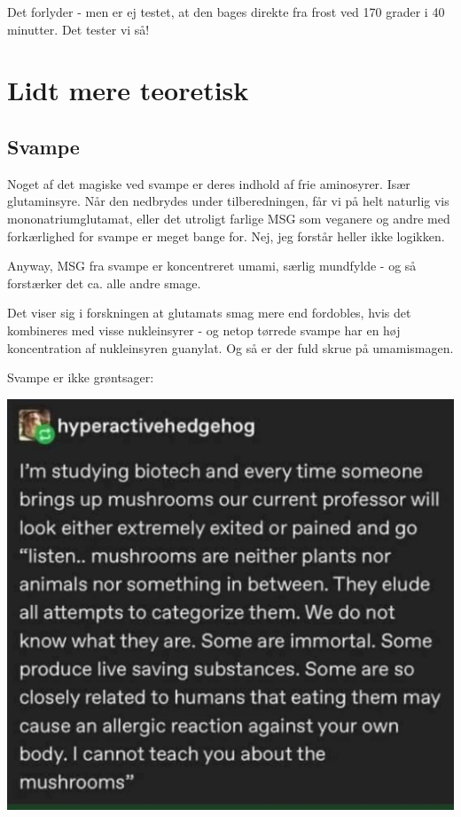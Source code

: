 \documentclass[
]{book}
\begin{document}
Det forlyder - men er ej testet, at den bages direkte fra
frost ved 170 grader i 40 minutter.
Det tester vi så!

\hypertarget{lidt-mere-teoretisk}{%
\chapter{Lidt mere teoretisk}\label{lidt-mere-teoretisk}}

\hypertarget{svampe}{%
\section{Svampe}\label{svampe}}

Noget af det magiske ved svampe er deres indhold af frie aminosyrer. Især
glutaminsyre. Når den nedbrydes under tilberedningen, får vi på helt naturlig
vis mononatriumglutamat, eller det utroligt farlige MSG som veganere og andre
med forkærlighed for svampe er meget bange for. Nej, jeg forstår heller ikke
logikken.

Anyway, MSG fra svampe er koncentreret umami, særlig mundfylde - og så forstærker
det ca. alle andre smage.

Det viser sig i forskningen at glutamats smag mere end fordobles, hvis det kombineres
med visse nukleinsyrer - og netop tørrede svampe har en høj koncentration af
nukleinsyren guanylat. Og så er der fuld skrue på umamismagen.

Svampe er ikke grøntsager:

\includegraphics{images/svampe.png}
\end{document}
